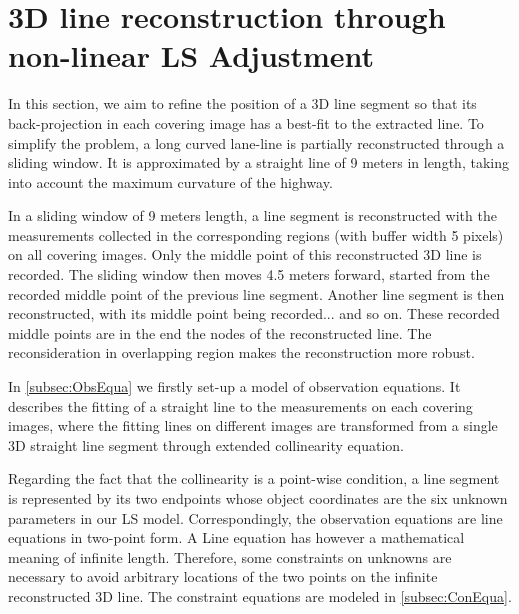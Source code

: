 
\clearpage
\section{3D line reconstruction through non-linear LS Adjustment}
\label{sec:LSadj}

In this section, we aim to refine the position of a 3D line segment so that its back-projection in each covering image has a best-fit to the extracted line. To simplify the problem, a long curved lane-line is partially reconstructed through a sliding window. It is approximated by a straight line of 9 meters in length, taking into account the maximum curvature of the highway.

In a sliding window of 9 meters length, a line segment is reconstructed with the measurements collected in the corresponding regions (with buffer width 5 pixels) on all covering images. Only the middle point of this reconstructed 3D line is recorded. The sliding window then moves 4.5 meters forward, started from the recorded middle point of the previous line segment. Another line segment is then reconstructed, with its middle point being recorded... and so on. These recorded middle points are in the end the nodes of the reconstructed line. The reconsideration in overlapping region makes the reconstruction more robust.

In \cref{subsec:ObsEqua} we firstly set-up a model of observation equations. It describes the fitting of a straight line to the measurements on each covering images, where the fitting lines on different images are transformed from a single 3D straight line segment through extended collinearity equation.

Regarding the fact that the collinearity is a point-wise condition, a line segment is represented by its two endpoints whose object coordinates are the six unknown parameters in our LS model. Correspondingly, the observation equations are line equations in two-point form. A Line equation has however a mathematical meaning of infinite length. Therefore, some constraints on unknowns are necessary to avoid arbitrary locations of the two points on the infinite reconstructed 3D line. The constraint equations are modeled in \cref{subsec:ConEqua}.




